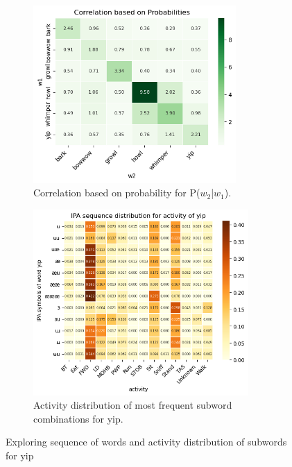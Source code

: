 \begin{figure}[t]
\centering
\begin{subfigure}[]{0.4\textwidth}
	\centering
	\includegraphics[width=0.85\textwidth]{images/w2w1.png}
	\caption{Correlation based on probability for P($w_2$|$w_1$).}
	\label{fig:w2w1}
\end{subfigure}
\begin{subfigure}[]{0.4\textwidth}
	\centering
	\includegraphics[width=0.9\textwidth]{images/ipa_yip.png}
	\caption{Activity distribution of most frequent subword combinations for yip.}
	\label{fig:subwords_yip}
\end{subfigure}
\caption{Exploring sequence of words and activity distribution of subwords for yip}
\end{figure}



